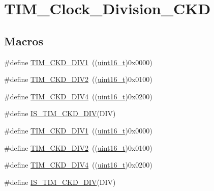 \hypertarget{group___t_i_m___clock___division___c_k_d}{}\section{T\+I\+M\+\_\+\+Clock\+\_\+\+Division\+\_\+\+C\+KD}
\label{group___t_i_m___clock___division___c_k_d}
\subsection*{Macros}
\begin{DoxyCompactItemize}
\item 
\#define \hyperlink{group___t_i_m___clock___division___c_k_d_ga88691a07b3976791977d280045b3c850}{T\+I\+M\+\_\+\+C\+K\+D\+\_\+\+D\+I\+V1}~((\hyperlink{_p_e___types_8h_a1f1825b69244eb3ad2c7165ddc99c956}{uint16\+\_\+t})0x0000)
\item 
\#define \hyperlink{group___t_i_m___clock___division___c_k_d_ga46a5fd6a173a7e88528a6e4084a08665}{T\+I\+M\+\_\+\+C\+K\+D\+\_\+\+D\+I\+V2}~((\hyperlink{_p_e___types_8h_a1f1825b69244eb3ad2c7165ddc99c956}{uint16\+\_\+t})0x0100)
\item 
\#define \hyperlink{group___t_i_m___clock___division___c_k_d_gac2e5c030f964f9b4c92fa8129fb923bc}{T\+I\+M\+\_\+\+C\+K\+D\+\_\+\+D\+I\+V4}~((\hyperlink{_p_e___types_8h_a1f1825b69244eb3ad2c7165ddc99c956}{uint16\+\_\+t})0x0200)
\item 
\#define \hyperlink{group___t_i_m___clock___division___c_k_d_ga9298ec9ad2d578a4c54e6c0dd4c03946}{I\+S\+\_\+\+T\+I\+M\+\_\+\+C\+K\+D\+\_\+\+D\+IV}(D\+IV)
\item 
\#define \hyperlink{group___t_i_m___clock___division___c_k_d_ga88691a07b3976791977d280045b3c850}{T\+I\+M\+\_\+\+C\+K\+D\+\_\+\+D\+I\+V1}~((\hyperlink{_p_e___types_8h_a1f1825b69244eb3ad2c7165ddc99c956}{uint16\+\_\+t})0x0000)
\item 
\#define \hyperlink{group___t_i_m___clock___division___c_k_d_ga46a5fd6a173a7e88528a6e4084a08665}{T\+I\+M\+\_\+\+C\+K\+D\+\_\+\+D\+I\+V2}~((\hyperlink{_p_e___types_8h_a1f1825b69244eb3ad2c7165ddc99c956}{uint16\+\_\+t})0x0100)
\item 
\#define \hyperlink{group___t_i_m___clock___division___c_k_d_gac2e5c030f964f9b4c92fa8129fb923bc}{T\+I\+M\+\_\+\+C\+K\+D\+\_\+\+D\+I\+V4}~((\hyperlink{_p_e___types_8h_a1f1825b69244eb3ad2c7165ddc99c956}{uint16\+\_\+t})0x0200)
\item 
\#define \hyperlink{group___t_i_m___clock___division___c_k_d_ga9298ec9ad2d578a4c54e6c0dd4c03946}{I\+S\+\_\+\+T\+I\+M\+\_\+\+C\+K\+D\+\_\+\+D\+IV}(D\+IV)
\end{DoxyCompactItemize}


